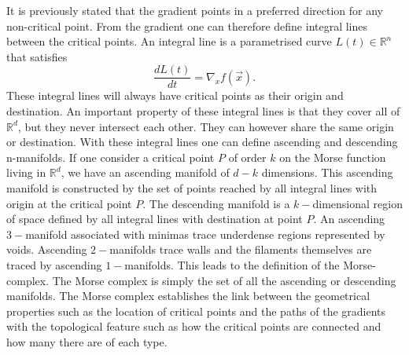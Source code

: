 It is previously stated that the gradient points in a preferred direction for any non-critical
point. From the gradient one can therefore define integral lines between the critical
points. An integral line is a parametrised curve $L(t)\in\mathbb{R}^n$ that satisfies
\begin{equation}
    \frac{dL(t)}{dt}=\nabla_xf(\vec{x}).
\end{equation}
These integral lines will always have critical points as their origin and
destination. An important property of these integral lines is that they cover
all of $\mathbb{R}^d$, but they never intersect each other. They can however
share the same origin or destination. With these integral lines one can define
ascending and descending n-manifolds. If one consider a critical point $P$ of
order $k$ on the Morse function living in $\mathbb{R}^d$, we have an ascending manifold of
$d-k$ dimensions. This ascending manifold is constructed by the set of points reached by
all integral lines with origin at the critical point $P$. The descending
manifold is a $k-$dimensional region of space defined by all integral lines with
destination at point $P$. An ascending $3-$manifold associated with minimas trace underdense regions represented by voids. Ascending $2-$manifolds trace walls and the filaments themselves are traced by ascending $1-$manifolds. This leads to the definition of the Morse-complex.
The Morse complex is simply the set of all the ascending or descending
manifolds. The Morse complex establishes the link between the geometrical properties such as the location of critical points and the paths of the gradients with the topological feature such as how the critical points are connected and how many there are of each type.\\
